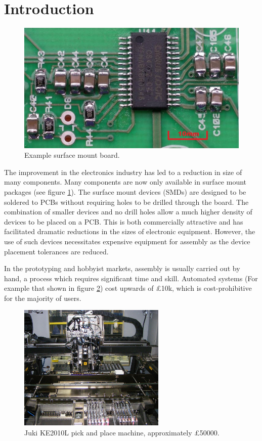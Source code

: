 \section{Introduction}

\begin{figure}[ht!]
\centering
\includegraphics[width=120mm]{resources/smt_soldering.jpg}
\caption{Example surface mount board.}
\label{smdexample}
\end{figure}

The improvement in the electronics industry has led to a reduction in 
size of many components. Many components are now only available in
surface mount packages (see figure \ref{smdexample}). The surface mount 
devices (\gls{SMD}s) are designed to be soldered to \gls{PCB}s without
requiring holes to be drilled through the board. The combination of
smaller devices and no drill holes allow a much higher density of
devices to be placed on a PCB. This is both commercially
attractive and has facilitated dramatic reductions in the sizes of
electronic equipment. However, the use of such devices necessitates expensive 
equipment for assembly as the device placement tolerances are reduced.

In the prototyping and hobbyist markets, assembly is usually carried
out by hand, a process which requires significant time and skill. 
Automated systems (For example that shown in figure \ref{pickandplace}) cost upwards of \pounds 10k, which is cost-prohibitive
for the majority of users. 

\begin{figure}[ht!]
\centering
\includegraphics[width=70mm]{resources/pickandplace.jpg}
\caption{Juki KE2010L pick and place machine, approximately \pounds 50000.}
\label{pickandplace}
\end{figure}

